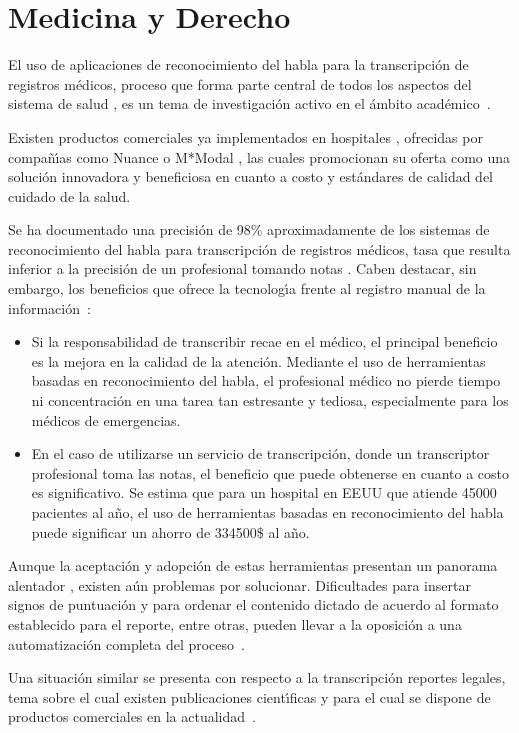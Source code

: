 \section{Medicina y Derecho}
\label{sec:medicina}

El uso de aplicaciones de reconocimiento del habla para la transcripci\'on de registros m\'edicos, proceso que forma parte central
de todos los aspectos del sistema de salud \cite{DavidListening2009}, es un tema de investigaci\'on activo en el \'ambito 
\mbox{acad\'emico \cite{LaiMedSpeak1997, HappeCombining2002}}.

Existen productos comerciales ya implementados en hospitales \cite{USATodayHospitals}, ofrecidas por compa\~n{\'\i}as 
como Nuance \cite{NuanceOptimizing, NuanceSpeech} o M*Modal \cite{MmodalSpeech}, las cuales promocionan su oferta 
como una soluci\'on innovadora y beneficiosa en cuanto a costo y est\'andares de calidad del cuidado de la salud.

Se ha documentado una precisi\'on de 98\% aproximadamente de los sistemas de reconocimiento del habla para transcripci\'on de registros
m\'edicos, tasa que resulta inferior a la precisi\'on de un profesional tomando notas \cite{DavidListening2009}. 
Caben destacar, sin embargo, los beneficios que ofrece la tecnolog{\'\i}a frente al registro manual de 
la \mbox{informaci\'on \cite{ZickVoice2001}}:

\begin{itemize}
	\item Si la responsabilidad de transcribir recae en el m\'edico, el principal beneficio es la mejora en la calidad de la atenci\'on.
	Mediante el uso de herramientas basadas en reconocimiento del habla, el profesional m\'edico no pierde tiempo ni concentraci\'on en
	una tarea tan estresante y tediosa, especialmente para los m\'edicos de emergencias.
	\item En el caso de utilizarse un servicio de transcripci\'on, donde un transcriptor profesional toma las notas, el beneficio que
	puede obtenerse en cuanto a costo es significativo. Se estima que para un hospital en EEUU que atiende 45000 pacientes al a\~no,
	el uso de herramientas basadas en reconocimiento del habla puede significar un ahorro de 334500\$ al a\~no.
\end{itemize}

Aunque la aceptaci\'on y adopci\'on de estas herramientas presentan un panorama alentador \cite{GrassoLong2003}, 
existen a\'un problemas por solucionar. Dificultades para insertar signos de puntuaci\'on y para ordenar el contenido dictado
de acuerdo al formato establecido para el reporte, entre otras, pueden llevar a la oposici\'on a una automatizaci\'on 
completa del \mbox{proceso \cite{DavidListening2009}}.

Una situaci\'on similar se presenta con respecto a la transcripci\'on reportes legales, tema sobre el cual existen publicaciones
cient{\'\i}ficas \cite{van-leeuwen2008improving, FalavignaAutomatic2009} y para el cual se dispone de productos comerciales
en la \mbox{actualidad \cite{NuanceLegal}}.
